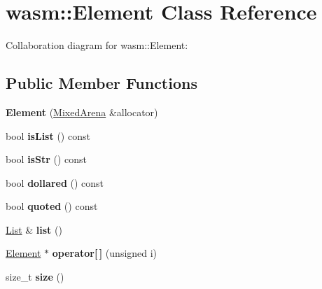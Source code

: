 \hypertarget{classwasm_1_1_element}{}\section{wasm\+:\+:Element Class Reference}
\label{classwasm_1_1_element}


Collaboration diagram for wasm\+:\+:Element\+:
\subsection*{Public Member Functions}
\begin{DoxyCompactItemize}
\item 
\mbox{\label{classwasm_1_1_element_add28873f988ea19b15613fb8bd50f847}} 
{\bfseries Element} (\mbox{\hyperlink{struct_mixed_arena}{Mixed\+Arena}} \&allocator)
\item 
\mbox{\label{classwasm_1_1_element_a2fa15308696117ba0613c82fa6e4fb00}} 
bool {\bfseries is\+List} () const
\item 
\mbox{\label{classwasm_1_1_element_a2c17e075c439a9e5eddee1f4585e21b4}} 
bool {\bfseries is\+Str} () const
\item 
\mbox{\label{classwasm_1_1_element_acfdba37ec4dbf655d472493aaff65665}} 
bool {\bfseries dollared} () const
\item 
\mbox{\label{classwasm_1_1_element_a543393a223615ce0df4b1477ef455953}} 
bool {\bfseries quoted} () const
\item 
\mbox{\label{classwasm_1_1_element_ad2c10c4294cebdac06a293f2eb84f2fb}} 
\mbox{\hyperlink{class_arena_vector}{List}} \& {\bfseries list} ()
\item 
\mbox{\label{classwasm_1_1_element_a676e2eca87f71b19815e1ded05687d4c}} 
\mbox{\hyperlink{classwasm_1_1_element}{Element}} $\ast$ {\bfseries operator\mbox{[}$\,$\mbox{]}} (unsigned i)
\item 
\mbox{\label{classwasm_1_1_element_aa6b62d97853e598483e88a97e3eabdf1}} 
size\+\_\+t {\bfseries size} ()

\end{DoxyCompactItemize}
